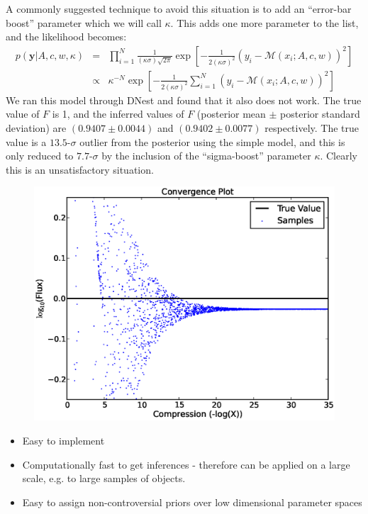 \documentclass[letterpaper, 11pt]{article}
\newcommand{\yy}{\mathbf{y}}
\begin{document}
A commonly suggested technique \citep[e.g.][]{gregory} to avoid this situation
is to add an ``error-bar boost'' parameter which we will call $\kappa$.
This adds one more parameter to the list, and the likelihood becomes:
\begin{eqnarray}
p(\yy|A, c, w, \kappa) &=& \prod_{i=1}^N
\frac{1}{(\kappa\sigma)\sqrt{2\pi}}
\exp
\left[
-\frac{1}{2(\kappa\sigma)^2}\left(y_i - \mathcal{M}(x_i; A, c, w)\right)^2
\right] \\
&\propto& \kappa^{-N}\exp\left[-\frac{1}{2(\kappa\sigma)^2}\sum_{i=1}^N\left(y_i - \mathcal{M}(x_i; A, c, w)\right)^2\right]
\end{eqnarray}
We ran this model through DNest and found that it also does not work. The
true value of $F$ is 1, and the inferred values of $F$ (posterior mean
$\pm$ posterior standard deviation) are
$(0.9407 \pm 0.0044)$ and $(0.9402 \pm 0.0077)$
respectively. The true value is a $13.5$-$\sigma$ outlier from the posterior
using the simple model, and this is only reduced to $7.7$-$\sigma$ by the
inclusion of the ``sigma-boost'' parameter $\kappa$. Clearly this is an
unsatisfactory situation.

\begin{figure}
\begin{center}
\includegraphics[scale=0.5]{convergence.eps}
\end{center}
\end{figure}

\begin{itemize}
\item Easy to implement \\
\item Computationally fast to get inferences - therefore can be applied on a large scale, e.g. to large samples of objects. \\
\item Easy to assign non-controversial priors over low dimensional parameter spaces \\
\end{itemize}
\end{document}
